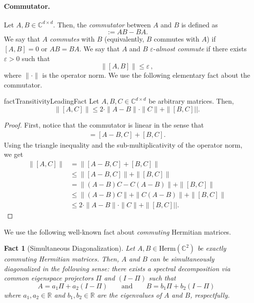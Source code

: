 \documentclass[a4paper,onecolumn,11pt]{quantumarticle}
\theoremstyle{plain}
\newtheorem{fact}[theorem]{Fact}
\newcommand{\eps}{\varepsilon}
\begin{document}
\paragraph{Commutator.} Let $A,B \in \mathbb{C}^{d \times d}$. Then, the \emph{commutator} between $A$ and $B$ is defined as
\begin{equation}
            [A, B] := AB - BA.
        \end{equation}
We say that $A$ \emph{commutes} with $B$ (equivalently, $B$ commutes with $A$) if $[A, B] = 0$ or $AB = BA$. We say that $A$ and $B$ $\eps$-\emph{almost commute} if there exists $\eps >0 $ such that
\begin{equation}
\|[A,B]\| \leq \eps \, ,
        \end{equation}
where $\|\cdot\|$ is the operator norm.
We use the following elementary fact about the commutator.
\begin{restatable}{fact}{TransitivityLeadingFact}\label{lem:transitivity-of-almost-commutatitivty}
Let $A,B,C \in \mathbb{C}^{d \times d}$ be arbitrary matrices. Then,
\begin{equation}
\| [A,C] \| \leq 2 \cdot \|A-B\| \cdot \|C\|+ \| [B,C]||.    
\end{equation}
\end{restatable}

\begin{proof}
First, notice that the commutator is linear in the sense that
\begin{align}
[A,C] = [A-B,C] + [B,C].    
\end{align}
Using the triangle inequality and the sub-multiplicativity of the operator norm, we get
\begin{align}
\| [A,C] \| &= \| [A-B,C] + [B,C] \| \\    
&\leq \| [A-B,C]\| + \|[B,C] \| \\
&= \| (A-B)C - C(A-B)\| + \|[B,C] \| \\
&\leq \| (A-B)C\| + \|C(A-B)\| + \|[B,C] \|\\
&\leq 2 \cdot \|A-B\| \cdot \|C\| + \| [B,C]||.
\end{align}
\end{proof}
\vspace{-0.2cm}We use the following well-known fact about \emph{commuting} Hermitian matrices.

\begin{fact}[Simultaneous Diagonalization]\label{fact:sim-diag}
    Let $A,B \in \mathrm{Herm}(\mathbb{C}^{2})$ be exactly commuting Hermitian matrices. Then, $A$ and $B$ can be \emph{simultaneously diagonalized} in the following sense: there exists a spectral decomposition via common eigenspace \emph{projectors} $\Pi$ and $(I-\Pi)$ such that
    \begin{equation}
        A = a_1 \Pi + a_2 (I -\Pi) \quad\quad \text{and} \quad\quad B = b_1 \Pi + b_2 (I - \Pi) \, 
    \end{equation}
    where $a_1,a_2 \in \mathbb{R}$ and $b_1,b_2 \in \mathbb{R}$ are the eigenvalues of $A$ and $B$, respectfully.
\end{fact}
\end{document}

